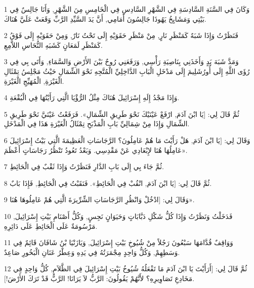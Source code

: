 \par 1 وَكَانَ فِي السَّنَةِ السَّادِسَةِ فِي الشَّهْرِ السَّادِسِ فِي الْخَامِسِ مِنَ الشَّهْرِ, وَأَنَا جَالِسٌ فِي بَيْتِي وَمَشَايِخُ يَهُوذَا جَالِسُونَ أَمَامِي, أَنَّ يَدَ السَّيِّدِ الرَّبِّ وَقَعَتْ عَلَيَّ هُنَاكَ.
\par 2 فَنَظَرْتُ وَإِذَا شَبَهٌ كَمَنْظَرِ نَارٍ, مِنْ مَنْظَرِ حَقَوَيْهِ إِلَى تَحْتُ نَارٌ, وَمِنْ حَقَوَيْهِ إِلَى فَوْقُ كَمَنْظَرِ لَمَعَانٍ كَشَبَهِ النُّحَاسِ اللاَّمِعِ.
\par 3 وَمَدَّ شَبَهَ يَدٍ وَأَخَذَنِي بِنَاصِيَةِ رَأْسِي, وَرَفَعَنِي رُوحٌ بَيْنَ الأَرْضِ وَالسَّمَاءِ, وَأَتَى بِي فِي رُؤَى اللَّهِ إِلَى أُورُشَلِيمَ إِلَى مَدْخَلِ الْبَابِ الدَّاخِلِيِّ الْمُتَّجِهِ نَحْوَ الشِّمَالِ حَيْثُ مَجْلِسُ تِمْثَالِ الْغَيْرَةِ, الْمُهَيِّجِ الْغَيْرَةِ.
\par 4 وَإِذَا مَجْدُ إِلَهِ إِسْرَائِيلَ هُنَاكَ مِثْلُ الرُّؤْيَا الَّتِي رَأَيْتُهَا فِي الْبُقْعَةِ.
\par 5 ثُمَّ قَالَ لِي: [يَا ابْنَ آدَمَ, ارْفَعْ عَيْنَيْكَ نَحْوَ طَرِيقِ الشِّمَالِ». فَرَفَعْتُ عَيْنَيَّ نَحْوَ طَرِيقِ الشِّمَالِ وَإِذَا مِنْ شِمَالِيِّ بَابِ الْمَذْبَحِ تِمْثَالُ الْغَيْرَةِ هَذَا فِي الْمَدْخَلِ.
\par 6 وَقَالَ لِي: [يَا ابْنَ آدَمَ, هَلْ رَأَيْتَ مَا هُمْ عَامِلُونَ؟ الرَّجَاسَاتِ الْعَظِيمَةَ الَّتِي بَيْتُ إِسْرَائِيلَ عَامِلُهَا هُنَا لإِبْعَادِي عَنْ مَقْدِسِي. وَبَعْدُ تَعُودُ تَنْظُرُ رَجَاسَاتٍ أَعْظَمَ».
\par 7 ثُمَّ جَاءَ بِي إِلَى بَابِ الدَّارِ فَنَظَرْتُ وَإِذَا ثَقْبٌ فِي الْحَائِطِ.
\par 8 ثُمَّ قَالَ لِي: [يَا ابْنَ آدَمَ, انْقُبْ فِي الْحَائِطِ». فَنَقَبْتُ فِي الْحَائِطِ, فَإِذَا بَابٌ.
\par 9 وَقَالَ لِي: [ادْخُلْ وَانْظُرِ الرَّجَاسَاتِ الشِّرِّيرَةَ الَّتِي هُمْ عَامِلُوهَا هُنَا».
\par 10 فَدَخَلْتُ وَنَظَرْتُ وَإِذَا كُلُّ شَكْلِ دَبَّابَاتٍ وَحَيَوَانٍ نَجِسٍ, وَكُلُّ أَصْنَامِ بَيْتِ إِسْرَائِيلَ, مَرْسُومَةٌ عَلَى الْحَائِطِ عَلَى دَائِرِهِ.
\par 11 وَوَاقِفٌ قُدَّامَهَا سَبْعُونَ رَجُلاً مِنْ شُيُوخِ بَيْتِ إِسْرَائِيلَ, وَيَازَنْيَا بْنُ شَافَانَ قَائِمٌ فِي وَسَطِهِمْ, وَكُلُّ وَاحِدٍ مِجْمَرَتُهُ فِي يَدِهِ وَعِطْرُ عَنَانِ الْبَخُورِ صَاعِدٌ.
\par 12 ثُمَّ قَالَ لِي: [أَرَأَيْتَ يَا ابْنَ آدَمَ مَا تَفْعَلُهُ شُيُوخُ بَيْتِ إِسْرَائِيلَ فِي الظَّلاَمِ, كُلُّ وَاحِدٍ فِي مَخَادِعِ تَصَاوِيرِهِ؟ لأَنَّهُمْ يَقُولُونَ: الرَّبُّ لاَ يَرَانَا! الرَّبُّ قَدْ تَرَكَ الأَرْضَ!].

